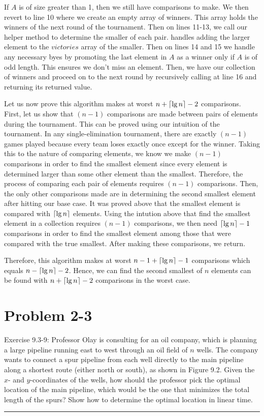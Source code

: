 \documentclass[11pt]{article}
\def\separateline{\medskip\hrule\medskip}
\DeclarePairedDelimiter{\ceil}{\lceil}{\rceil}
\begin{document}
If $A$ is of size greater than 1, then we still have comparisons to make. We then revert to line 10 where we create an empty array of winners. This array holds the winners of the next round of the tournament. Then on lines 11-13, we call our helper method  to determine the smaller of each pair.  handles adding the larger element to the $victories$ array of the smaller. Then on lines 14 and 15 we handle any necessary byes by promoting the last element in $A$ as a winner only if $A$ is of odd length. This ensures we don't miss an element. Then, we have our collection of winners and proceed on to the next round by recursively calling  at line 16 and returning its returned value.

Let us now prove this algorithm makes at worst $n + \ceil{\lg{n}} - 2$ comparisons. First, let us show that $(n-1)$ comparisons are made between pairs of elements during the tournament. This can be proved using our intuition of the tournament. In any single-elimination tournament, there are exactly $(n-1)$ games played because every team loses exactly once except for the winner. Taking this to the nature of comparing elements, we know we make $(n-1)$ comparisons in order to find the smallest element since every element is determined larger than some other element than the smallest. Therefore, the process of comparing each pair of elements requires $(n-1)$ comparisons. Then, the only other comparisons made are in determining the second smallest element after hitting our base case. It was proved above that the smallest element is compared with $\ceil{\lg{n}}$ elements. Using the intution above that find the smallest element in a collection requires $(n-1)$ comparisons, we then need $\ceil{\lg{n}} - 1$ comparisons in order to find the smallest element among those that were compared with the true smallest. After making these comparisons, we return.

Therefore, this algorithm makes at worst $n - 1 + \ceil{\lg{n}} - 1$ comparisons which equals $n - \ceil{\lg{n}} - 2$. Hence, we can find the second smallest of $n$ elements can be found with $n + \ceil{\lg{n}} - 2$ comparisons in the worst case.

\newpage

\section{Problem 2-3}
Exercise 9.3-9: Professor Olay is consulting for an oil company, which is planning a large pipeline running east to west through an oil field of $n$ wells. The company wants to connect a spur pipeline from each well directly to the main pipeline along a shortest route (either north or south), as shown in Figure 9.2. Given the $x$- and $y$-coordinates of the wells, how should the professor pick the optimal location of the main pipeline, which would be the one that minimizes the total length of the spurs? Show how to determine the optimal location in linear time.
\separateline
\end{document}
